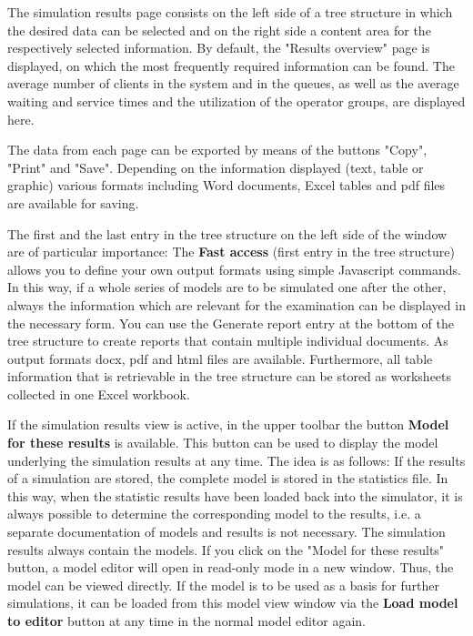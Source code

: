 \documentclass{svmono}
\begin{document}
The simulation results page consists on the left side of a tree structure in which the desired data can be selected and on the right side a content area for the respectively selected information. By default, the "Results overview" page is displayed, on which the most frequently required information can be found. The average number of clients in the system and in the queues, as well as the average waiting and service times and the utilization of the operator groups, are displayed here.

The data from each page can be exported by means of the buttons "Copy", "Print" and "Save". Depending on the information displayed (text, table or graphic) various formats including Word documents, Excel tables and pdf files are available for saving.

The first and the last entry in the tree structure on the left side of the window are of particular importance: The \textbf{Fast access} (first entry in the tree structure) allows you to define your own output formats using simple Javascript commands. In this way, if a whole series of models are to be simulated one after the other, always the information which are relevant for the examination can be displayed in the necessary form. You can use the Generate report entry at the bottom of the tree structure to create reports that contain multiple individual documents. As output formats docx, pdf and html files are available. Furthermore, all table information that is retrievable in the tree structure can be stored as worksheets collected in one Excel workbook.

If the simulation results view is active, in the upper toolbar the button \textbf{Model for these results} is available. This button can be used to display the model underlying the simulation results at any time. The idea is as follows: If the results of a simulation are stored, the complete model is stored in the statistics file. In this way, when the statistic results have been loaded back into the simulator, it is always possible to determine the corresponding model to the results, i.e. a separate documentation of models and results is not necessary. The simulation results always contain the models. If you click on the "Model for these results" button, a model editor will open in read-only mode in a new window. Thus, the model can be viewed directly. If the model is to be used as a basis for further simulations, it can be loaded from this model view window via the \textbf{Load model to editor} button at any time in the normal model editor again.
\end{document}
